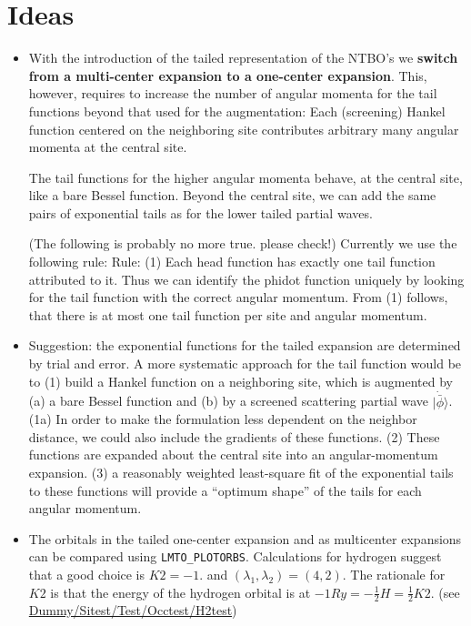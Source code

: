\documentclass[11pt,a4paper]{report}
\begin{document}
\section{Ideas}
\begin{itemize}
\item With the introduction of the tailed representation of the NTBO's
  we \textbf{switch from a multi-center expansion to a one-center
    expansion}.  This, however, requires to increase the number of
  angular momenta for the tail functions beyond that used for the
  augmentation: Each (screening) Hankel function centered on the
  neighboring site contributes arbitrary many angular momenta at the
  central site.

  The tail functions for the higher angular momenta behave, at the
  central site, like a bare Bessel function. Beyond the central site,
  we can add the same pairs of exponential tails as for the lower
  tailed partial waves.

  (The following is probably no more true. please check!) Currently we
  use the following rule: Rule: (1) Each head function has exactly one
  tail function attributed to it.  Thus we can identify the phidot
  function uniquely by looking for the tail function with the correct
  angular momentum.  From (1) follows, that there is at most one tail
  function per site and angular momentum.
%
\item Suggestion: the exponential functions for the tailed expansion
  are determined by trial and error. A more systematic approach for
  the tail function would be to (1) build a Hankel function on a
  neighboring site, which is augmented by (a) a bare Bessel function
  and (b) by a screened scattering partial wave
  $|\dot{\bar{\phi}}\rangle$. (1a) In order to make the formulation
  less dependent on the neighbor distance, we could also include the
  gradients of these functions. (2) These functions are expanded about
  the central site into an angular-momentum expansion.  (3) a
  reasonably weighted least-square fit of the exponential tails to
  these functions will provide a ``optimum shape'' of the tails for
  each angular momentum.
%
\item The orbitals in the tailed one-center expansion and as
  multicenter expansions can be compared using \verb|LMTO_PLOTORBS|.
  Calculations for hydrogen suggest that a good choice is $K2=-1.$ and
  $(\lambda_1,\lambda_2)=(4,2)$. The rationale for $K2$ is that the
  energy of the hydrogen orbital is at
  $-1Ry=-\frac{1}{2}H=\frac{1}{2}K2$. (see
  \url{Dummy/Sitest/Test/Occtest/H2test})
\end{itemize}
\end{document}
